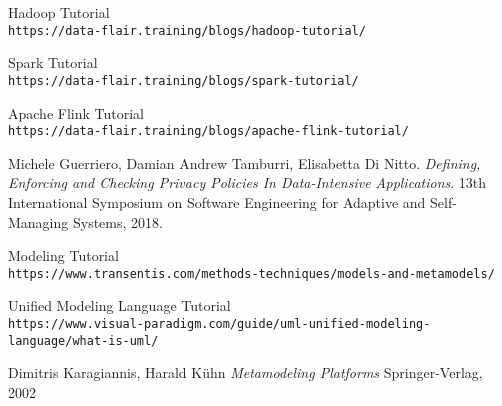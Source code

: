 \begin{thebibliography}{9}

Hadoop Tutorial
\\\texttt{https://data-flair.training/blogs/hadoop-tutorial/}

Spark Tutorial
\\\texttt{https://data-flair.training/blogs/spark-tutorial/}

Apache Flink Tutorial
\\\texttt{https://data-flair.training/blogs/apache-flink-tutorial/}

Michele Guerriero, Damian Andrew Tamburri, Elisabetta Di Nitto.
\textit{Defining, Enforcing and Checking Privacy Policies In Data-Intensive Applications}. 
13th International Symposium on Software Engineering for Adaptive and Self-Managing Systems, 2018.

Modeling Tutorial
\\\texttt{https://www.transentis.com/methods-techniques/models-and-metamodels/}

Unified Modeling Language Tutorial
\\\texttt{https://www.visual-paradigm.com/guide/uml-unified-modeling-language/what-is-uml/}

Dimitris Karagiannis, Harald Kühn
\textit{Metamodeling Platforms}
Springer-Verlag, 2002

\end{thebibliography}
